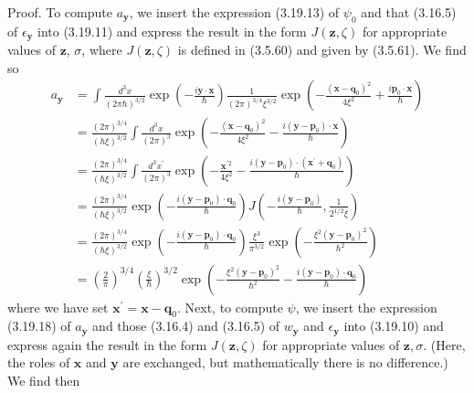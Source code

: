 \documentclass{article}
\begin{document}
Proof. To compute $a_{\boldsymbol{y}}$, we insert the expression (3.19.13) of $\psi_{0}$ and that (3.16.5) of $\epsilon_{\boldsymbol{y}}$ into (3.19.11) and express the result in the form $J(\boldsymbol{z}, \zeta)$ for appropriate values of $\boldsymbol{z}$, $\sigma$, where $J(\boldsymbol{z}, \zeta)$ is defined in (3.5.60) and given by (3.5.61). We find so
$$
\begin{align*}
a_{\boldsymbol{y}} & =\int \frac{d^{3} x}{(2 \pi \hbar)^{3 / 2}} \exp \left(-\frac{i \boldsymbol{y} \cdot \boldsymbol{x}}{\hbar}\right) \frac{1}{(2 \pi)^{3 / 4} \xi^{3 / 2}} \exp \left(-\frac{\left(\boldsymbol{x}-\boldsymbol{q}_{0}\right)^{2}}{4 \xi^{2}}+\frac{i \boldsymbol{p}_{0} \cdot \boldsymbol{x}}{\hbar}\right)  \tag{3.19.18}\\
& =\frac{(2 \pi)^{3 / 4}}{(\hbar \xi)^{3 / 2}} \int \frac{d^{3} x}{(2 \pi)^{3}} \exp \left(-\frac{\left(\boldsymbol{x}-\boldsymbol{q}_{0}\right)^{2}}{4 \xi^{2}}-\frac{i\left(\boldsymbol{y}-\boldsymbol{p}_{0}\right) \cdot \boldsymbol{x}}{\hbar}\right) \\
& =\frac{(2 \pi)^{3 / 4}}{(\hbar \xi)^{3 / 2}} \int \frac{d^{3} x^{\prime}}{(2 \pi)^{3}} \exp \left(-\frac{\boldsymbol{x}^{\prime 2}}{4 \xi^{2}}-\frac{i\left(\boldsymbol{y}-\boldsymbol{p}_{0}\right) \cdot\left(\boldsymbol{x}^{\prime}+\boldsymbol{q}_{0}\right)}{\hbar}\right) \\
& =\frac{(2 \pi)^{3 / 4}}{(\hbar \xi)^{3 / 2}} \exp \left(-\frac{i\left(\boldsymbol{y}-\boldsymbol{p}_{0}\right) \cdot \boldsymbol{q}_{0}}{\hbar}\right) J\left(-\frac{i\left(\boldsymbol{y}-\boldsymbol{p}_{0}\right)}{\hbar}, \frac{1}{2^{1 / 2} \xi}\right) \\
& =\frac{(2 \pi)^{3 / 4}}{(\hbar \xi)^{3 / 2}} \exp \left(-\frac{i\left(\boldsymbol{y}-\boldsymbol{p}_{0}\right) \cdot \boldsymbol{q}_{0}}{\hbar}\right) \frac{\xi^{3}}{\pi^{3 / 2}} \exp \left(-\frac{\xi^{2}\left(\boldsymbol{y}-\boldsymbol{p}_{0}\right)^{2}}{\hbar^{2}}\right) \\
& =\left(\frac{2}{\pi}\right)^{3 / 4}\left(\frac{\xi}{\hbar}\right)^{3 / 2} \exp \left(-\frac{\xi^{2}\left(\boldsymbol{y}-\boldsymbol{p}_{0}\right)^{2}}{\hbar^{2}}-\frac{i\left(\boldsymbol{y}-\boldsymbol{p}_{0}\right) \cdot \boldsymbol{q}_{0}}{\hbar}\right)
\end{align*}
$$
where we have set $\boldsymbol{x}^{\prime}=\boldsymbol{x}-\boldsymbol{q}_{0}$. Next, to compute $\psi$, we insert the expression (3.19.18) of $a_{\boldsymbol{y}}$ and those (3.16.4) and (3.16.5) of $w_{\boldsymbol{y}}$ and $\epsilon_{\boldsymbol{y}}$ into (3.19.10) and express again the result in the form $J(\boldsymbol{z}, \zeta)$ for appropriate values of $\boldsymbol{z}, \sigma$. (Here, the roles of $\boldsymbol{x}$ and $\boldsymbol{y}$ are exchanged, but mathematically there is no difference.) We find then
\end{document}

